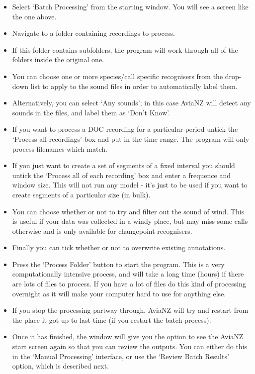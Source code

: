 \documentclass{article}
\begin{document}
\begin{itemize}
\item Select `Batch Processing' from the starting window. You will see a screen like the one above. 
\item Navigate to a folder containing recordings to process. 
\item If this folder contains subfolders, the program will work through all of the folders inside the original one. 
\item You can choose one or more species/call specific recognisers from the drop-down list to apply to the sound files in order to automatically label them. 
\item Alternatively, you can select `Any sounds'; in this case AviaNZ will detect any sounds in the files, and label them as `Don't Know'. 
\item If you want to process a DOC recording for a particular period untick the `Process all recordings' box and put in the time range. The program will only process filenames which match.
\item If you just want to create a set of segments of a fixed interval you should untick the `Process all of each recording' box and enter a frequence and window size. This will not run any model - it's just to be used if you want to create segments of a particular size (in bulk).
\item You can choose whether or not to try and filter out the sound of wind. This is useful if your data was collected in a windy place, but may miss some calls otherwise and is only available for changepoint recognisers.
\item Finally you can tick whether or not to overwrite existing annotations.
\item Press the `Process Folder' button to start the program. This is a very computationally intensive process, and will take a long time (hours) if there are lots of files to process. If you have a lot of files do this kind of processing overnight as it will make your computer hard to use for anything else.
\item If you stop the processing partway through, AviaNZ will try and restart from the place it got up to last time (if you restart the batch process).
\item Once it has finished, the window will give you the option to see the AviaNZ start screen again so that you can review the outputs. You can either do this in the `Manual Processing' interface, or use the `Review Batch Results' option, which is described next. 
\end{itemize}
\end{document}
